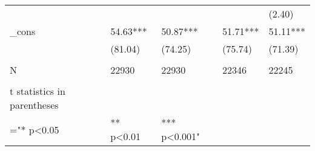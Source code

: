 \documentclass{article}
\begin{document}
\begin{table}[htbp]
\begin{tabular}{lllrr}
          &       &       & \multicolumn{1}{l}{} & \multicolumn{1}{l}{(2.40)} \\
    \_cons & 54.63*** & 50.87*** & \multicolumn{1}{l}{51.71***} & \multicolumn{1}{l}{51.11***} \\
          & (81.04) & (74.25) & \multicolumn{1}{l}{(75.74)} & \multicolumn{1}{l}{(71.39)} \\
          &       &       &       &  \\
    N     & 22930 & 22930 & \multicolumn{1}{l}{22346} & \multicolumn{1}{l}{22245} \\
          &       &       &       &  \\
    t statistics in parentheses &       &       &       &  \\
    ="* p<0.05 &  ** p<0.01 &  *** p<0.001" &       &  \\
    \bottomrule
    \bottomrule
    \end{tabular}%
  \label{tab:addlabel}%
\end{table}%
\end{document}
